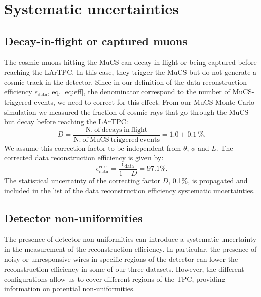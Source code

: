 \documentclass[a4paper]{scrartcl}
\begin{document}
\section{Systematic uncertainties}
\subsection{Decay-in-flight or captured muons}\label{sec:dif}
The cosmic muons hitting the MuCS can decay in flight or being captured before reaching the LArTPC. In this case, they trigger the MuCS but do not generate a cosmic track in the detector. Since in our definition of the data reconstruction efficiency $\epsilon_{\mathrm{data}}$, eq. \eqref{eq:eff}, the denominator correspond to the number of MuCS-triggered events, we need to correct for this effect. From our MuCS Monte Carlo simulation we measured the fraction of cosmic rays that go through the MuCS but decay before reaching the LArTPC:
\begin{equation}
D = \frac{\mathrm{N.~of~decays~in~flight}}{\mathrm{N.~of~MuCS~triggered~events}} = 1.0 \pm 0.1~\%.
\end{equation}
We assume this correction factor to be independent from $\theta$, $\phi$ and $L$. The corrected data reconstruction efficiency is given by:
\begin{equation}
\epsilon_{\mathrm{data}}^{\mathrm{corr}} =  \frac{\epsilon_{\mathrm{data}}}{1-D} = 97.1\%.
\end{equation}
The statistical uncertainty of the correcting factor $D$, 0.1\%, is propagated and included in the list of the data reconstruction efficiency systematic uncertainties.

\subsection{Detector non-uniformities}\label{sec:wires}
The presence of detector non-uniformities can introduce a systematic uncertainty in the measurement of the reconstruction efficiency. In particular, the presence of noisy or unresponsive wires in specific regions of the detector can lower the reconstruction efficiency in some of our three datasets. However, the different configurations allow us to cover different regions of the TPC, providing information on potential non-uniformities.
\end{document}
